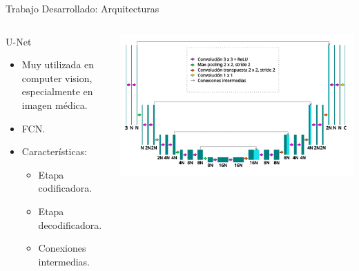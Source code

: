 \documentclass[xcolor=dvipsnames,table]{beamer}
\begin{document}
\begin{frame}{Trabajo Desarrollado: Arquitecturas}
	\begin{columns}[T]
		\vspace{0.5cm} %
		\begin{block}{U-Net}
			\begin{itemize}
				\item Muy utilizada en computer vision, especialmente en imagen médica.
				\item FCN.
				\item Características:
				\begin{itemize}
					\item Etapa codificadora.
					\item Etapa decodificadora.
					\item Conexiones intermedias.
				\end{itemize}
			\end{itemize}
		\end{block}
		
		\vspace{1cm} 
		\begin{minipage}[t]{\textwidth}
			\centering
			\includegraphics[width=\textwidth]{my_images/metodologia/U-Net.png}\\[1ex]
		\end{minipage}\hfill
		
	\end{columns}
\end{frame}
\end{document}
